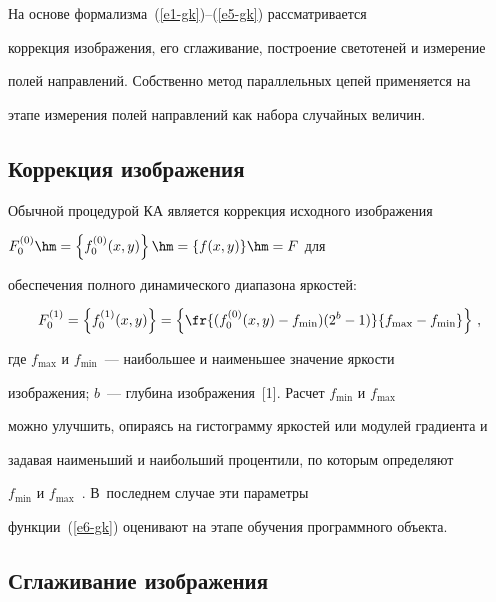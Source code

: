   На основе формализма~(\ref{e1-gk})--(\ref{e5-gk}) рассматривается 


коррекция изображения, его сглаживание, построение светотеней и измерение 


полей направлений. Собственно метод параллельных цепей применяется на 


этапе измерения полей направлений как набора случайных величин.


  


\subsection{Коррекция изображения} %





  Обычной процедурой КА является коррекция исходного изображения 


$F_0^{(0)}\hm= \left\{ f_0^{(0)}(x,y)\right\} \hm= \{f(x,y)\} \hm= F$ для 


обеспечения полного динамического диапазона яркостей:


  \begin{equation}


  F_0^{(1)} = \left\{ f_0^{(1)} (x,y)\right\} =\left\{ \fr{(f_0^{(0)}(x,y)-f_{\min}) 


(2^b-1)}{f_{\max}-f_{\min}}\right\}\,,


  \label{e6-gk}


  \end{equation}


где $f_{\max}$ и $f_{\min}$~--- наибольшее и наименьшее значение яркости 


изображения; $b$~--- глубина изображения~[1]. Расчет $f_{\min}$ и $f_{\max}$ 


можно улучшить, опираясь на гистограмму яркостей или модулей градиента и 


задавая наименьший и наибольший процентили, по которым определяют 


$f_{\min}$ и $f_{\max}$~\cite{3-gk}. В~последнем случае эти параметры 


функции~(\ref{e6-gk}) оценивают на этапе обучения программного объекта.


  


\subsection{Сглаживание изображения} %


